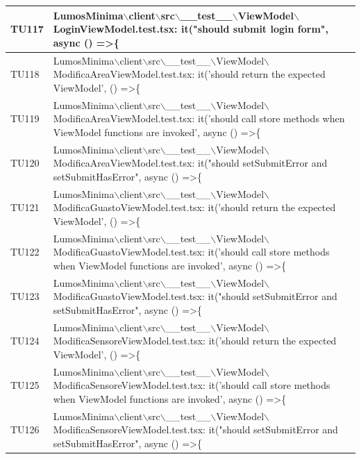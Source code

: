 \documentclass[12pt]{article}
\begin{document}
\begin{xltabular}{\linewidth}{|>{\hsize}X|X|}
	TU117 & LumosMinima$\backslash$client$\backslash$src$\backslash$\_\_test\_\_$\backslash$ViewModel$\backslash$LoginViewModel.test.tsx: it("should submit login form", async () =\textgreater \{ \\ \hline
	TU118 & LumosMinima$\backslash$client$\backslash$src$\backslash$\_\_test\_\_$\backslash$ViewModel$\backslash$ModificaAreaViewModel.test.tsx: it('should return the expected ViewModel', () =\textgreater \{ \\ \hline
	TU119 & LumosMinima$\backslash$client$\backslash$src$\backslash$\_\_test\_\_$\backslash$ViewModel$\backslash$ModificaAreaViewModel.test.tsx: it('should call store methods when ViewModel functions are invoked', async () =\textgreater \{ \\ \hline
	TU120 & LumosMinima$\backslash$client$\backslash$src$\backslash$\_\_test\_\_$\backslash$ViewModel$\backslash$ModificaAreaViewModel.test.tsx: it("should setSubmitError and setSubmitHasError", async () =\textgreater \{ \\ \hline
	TU121 & LumosMinima$\backslash$client$\backslash$src$\backslash$\_\_test\_\_$\backslash$ViewModel$\backslash$ModificaGuastoViewModel.test.tsx: it('should return the expected ViewModel', () =\textgreater \{ \\ \hline
	TU122 & LumosMinima$\backslash$client$\backslash$src$\backslash$\_\_test\_\_$\backslash$ViewModel$\backslash$ModificaGuastoViewModel.test.tsx: it('should call store methods when ViewModel functions are invoked', async () =\textgreater \{ \\ \hline
	TU123 & LumosMinima$\backslash$client$\backslash$src$\backslash$\_\_test\_\_$\backslash$ViewModel$\backslash$ModificaGuastoViewModel.test.tsx: it("should setSubmitError and setSubmitHasError", async () =\textgreater \{ \\ \hline
	TU124 & LumosMinima$\backslash$client$\backslash$src$\backslash$\_\_test\_\_$\backslash$ViewModel$\backslash$ModificaSensoreViewModel.test.tsx: it('should return the expected ViewModel', () =\textgreater \{ \\ \hline
	TU125 & LumosMinima$\backslash$client$\backslash$src$\backslash$\_\_test\_\_$\backslash$ViewModel$\backslash$ModificaSensoreViewModel.test.tsx: it('should call store methods when ViewModel functions are invoked', async () =\textgreater \{ \\ \hline
	TU126 & LumosMinima$\backslash$client$\backslash$src$\backslash$\_\_test\_\_$\backslash$ViewModel$\backslash$ModificaSensoreViewModel.test.tsx: it("should setSubmitError and setSubmitHasError", async () =\textgreater \{ \\ \hline
\end{xltabular}
\end{document}
